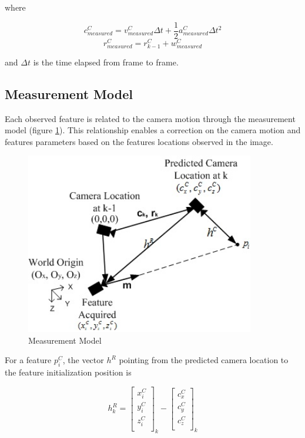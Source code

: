 \noindent where 

$$c_{measured}^{C}=v_{measured}^{C}\Delta t+ \frac{1}{2}a_{measured}^{C}\Delta t^{2}$$
$$r_{measured}^{C}=r_{k-1}^{C}+ w_{measured}^{C}$$

\noindent and $\Delta t$ is the time elapsed from frame to frame. 

\subsection{Measurement Model}

Each observed feature is related to the camera motion through the
measurement model (figure \ref{fig:measurement_model}). This
relationship enables a correction on the camera motion and features
parameters based on the features locations observed in the image.

\begin{figure}[h]
\centering
\includegraphics[width=10cm, keepaspectratio=true]{./Figures/measurement_model.jpg}
\caption{Measurement Model}
\label{fig:measurement_model}
\end{figure}

For a feature $p_{i}^{C}$, the vector $h^{R}$ pointing from the 
predicted camera location to the feature initialization position is 

\begin{equation}
h_{k}^{R}=\begin{bmatrix}
x_{i}^{C} \\
y_{i}^{C} \\
z_{i}^{C} \\
\end{bmatrix}_{k}-\begin{bmatrix}
c_{x}^{C} \\
c_{y}^{C} \\
c_{z}^{C} \\
\end{bmatrix}_{k}
\end{equation}

